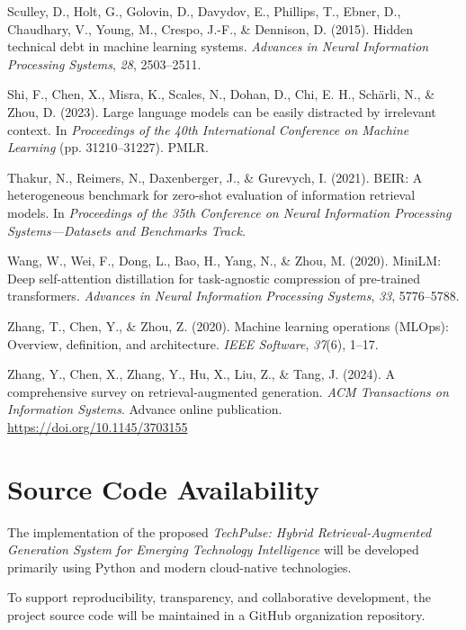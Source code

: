 \documentclass[12pt,a4paper]{report}
\begin{document}
\begin{flushleft}
Sculley, D., Holt, G., Golovin, D., Davydov, E., Phillips, T., Ebner, D., Chaudhary, V., Young, M., Crespo, J.-F., \& Dennison, D. (2015). Hidden technical debt in machine learning systems. \textit{Advances in Neural Information Processing Systems}, \textit{28}, 2503--2511.

Shi, F., Chen, X., Misra, K., Scales, N., Dohan, D., Chi, E. H., Sch\"{a}rli, N., \& Zhou, D. (2023). Large language models can be easily distracted by irrelevant context. In \textit{Proceedings of the 40th International Conference on Machine Learning} (pp. 31210--31227). PMLR.

Thakur, N., Reimers, N., Daxenberger, J., \& Gurevych, I. (2021). BEIR: A heterogeneous benchmark for zero-shot evaluation of information retrieval models. In \textit{Proceedings of the 35th Conference on Neural Information Processing Systems---Datasets and Benchmarks Track}.

Wang, W., Wei, F., Dong, L., Bao, H., Yang, N., \& Zhou, M. (2020). MiniLM: Deep self-attention distillation for task-agnostic compression of pre-trained transformers. \textit{Advances in Neural Information Processing Systems}, \textit{33}, 5776--5788.

Zhang, T., Chen, Y., \& Zhou, Z. (2020). Machine learning operations (MLOps): Overview, definition, and architecture. \textit{IEEE Software}, \textit{37}(6), 1--17.

Zhang, Y., Chen, X., Zhang, Y., Hu, X., Liu, Z., \& Tang, J. (2024). A comprehensive survey on retrieval-augmented generation. \textit{ACM Transactions on Information Systems}. Advance online publication. \url{https://doi.org/10.1145/3703155}



\appendix

\chapter{Source Code Availability}

The implementation of the proposed \textit{TechPulse: Hybrid Retrieval-Augmented Generation System for Emerging Technology Intelligence} will be developed primarily using Python and modern cloud-native technologies. 

To support reproducibility, transparency, and collaborative development, the project source code will be maintained in a GitHub organization repository.


\end{flushleft}
\end{document}
